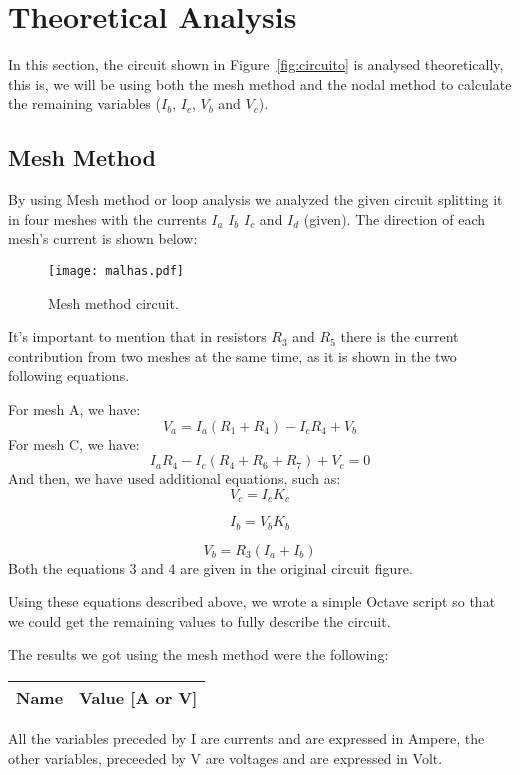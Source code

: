 \section{Theoretical Analysis}
\label{sec:analysis}

In this section, the circuit shown in Figure~\ref{fig:circuito} is analysed
theoretically, this is, we will be using both the mesh method and the nodal method to calculate the remaining variables ($I_b$, $I_c$, $V_b$ and $V_c$).

\subsection{Mesh Method}

By using Mesh method or loop analysis we analyzed the given circuit splitting it in four meshes with the currents $I_a$ $I_b$ $I_c$ and $I_d$ (given). The direction of each mesh’s current is shown below:

\begin{figure}[H] \centering
\texttt{[image: malhas.pdf]}
\caption{Mesh method circuit.}
\label{fig:malhas}
\end{figure}

It’s important to mention that in resistors $R_3$ and $R_5$ there is the current contribution from two meshes at the same time, as it is shown in the two following equations. \par
For mesh A, we have:
\begin{equation}
  V_a = I_a (R_1+R_4)-I_c R_4 + V_b
  \label{eq1}
\end{equation}
For mesh C, we have:
\begin{equation}
  I_a R_4 - I_c (R_4+R_6+R_7) + V_c = 0
  \label{eq2}
\end{equation}
And then, we have used additional equations, such as:
\begin{equation}
  V_c = I_c K_c
  \label{eq3}
\end{equation}

\begin{equation}
  I_b = V_b K_b
  \label{eq4}
\end{equation}

\begin{equation}
  V_b = R_3 (I_a+I_b)
  \label{eq5}
\end{equation}
Both the equations 3 and 4 are given in the original circuit figure. \par
Using these equations described above, we wrote a simple Octave script so that we could get the remaining values to fully describe the circuit. \par
The results we got using the mesh method were the following: 
\begin{center}
  \begin{tabular}{ | c | c | }
    \hline    
    {\bf Name} & {\bf Value [A or V]} \\ \hline
    
    \hline
  \end{tabular}
\end{center}
All the variables preceded by I are currents and are expressed in Ampere, the other variables, preceeded by V are voltages and are expressed in Volt.

